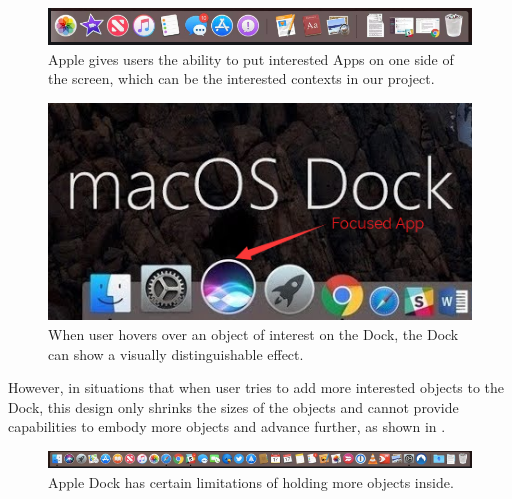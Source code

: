 \begin{figure}[th]
\centering
\includegraphics[width=\textwidth,keepaspectratio]{Figures/Chapter1/macosdock1.png}
\decoRule
\caption[MacOS Dock]{Apple gives users the ability to put interested Apps on one side of the screen, which can be the interested contexts in our project.}
\label{fig:macosdock1}
\end{figure}

\begin{figure}[th]
\centering
\includegraphics{Figures/Chapter1/macosdock1-1.png}
\decoRule
\caption[MacOS Dock Hover]{When user hovers over an object of interest on the Dock, the Dock can show a visually distinguishable effect.}
\label{fig:macosdock1-1}
\end{figure}

However, in situations that when user tries to add more interested objects to the Dock, this design only shrinks the sizes of the objects and cannot provide capabilities to embody more objects and advance further, as shown in .

\begin{figure}[th]
\centering
\includegraphics[width=\textwidth,keepaspectratio]{Figures/Chapter1/macosdock2.png}
\decoRule
\caption[MacOS Dock With More Apps]{Apple Dock has certain limitations of holding more objects inside.}
\label{fig:macosdock2}
\end{figure}

